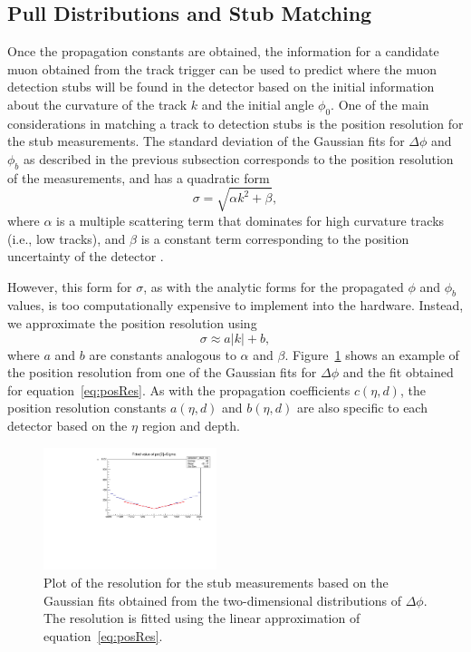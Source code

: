 \subsection{Pull Distributions and Stub Matching}
\label{subsec:pulls}

Once the propagation constants are obtained, the information for a candidate muon obtained from the track trigger can be used to predict where the muon detection stubs will be found in the detector based on the initial information about the curvature of the track $k$ and the initial angle $\phi_0$.
One of the main considerations in matching a track to detection stubs is the position resolution for the stub measurements.
The standard deviation of the Gaussian fits for $\Delta\phi$ and $\phi_b$ as described in the previous subsection corresponds to the position resolution of the measurements, and has a quadratic form
\begin{equation}
  \sigma=\sqrt{\alpha k^2+\beta},
\end{equation}
where $\alpha$ is a multiple scattering term that dominates for high curvature tracks (i.e., low \pt tracks), and $\beta$ is a constant term corresponding to the position uncertainty of the detector \cite{PhysRevD.98.030001}.

However, this form for $\sigma$, as with the analytic forms for the propagated $\phi$ and $\phi_b$ values, is too computationally expensive to implement into the hardware.
Instead, we approximate the position resolution using
\begin{equation}\label{eq:posRes}
  \sigma\approx a|k|+b,
\end{equation}
where $a$ and $b$ are constants analogous to $\alpha$ and $\beta$.
Figure~\ref{fig:deltaPhiRes} shows an example of the position resolution from one of the Gaussian fits for $\Delta\phi$ and the fit obtained for equation~\ref{eq:posRes}.
As with the propagation coefficients $c(\eta,d)$, the position resolution constants $a(\eta,d)$ and $b(\eta,d)$ are also specific to each detector based on the $\eta$ region and depth.

\begin{figure}[htbp] %
  \centering
  \includegraphics[width=0.45\textwidth]{fig/TPS/deltaPhi_res.pdf}
  \caption{
    Plot of the resolution for the stub measurements based on the Gaussian fits obtained from the two-dimensional distributions of $\Delta\phi$.
    The resolution is fitted using the linear approximation of equation~\ref{eq:posRes}.
  }
  \label{fig:deltaPhiRes}
\end{figure}

